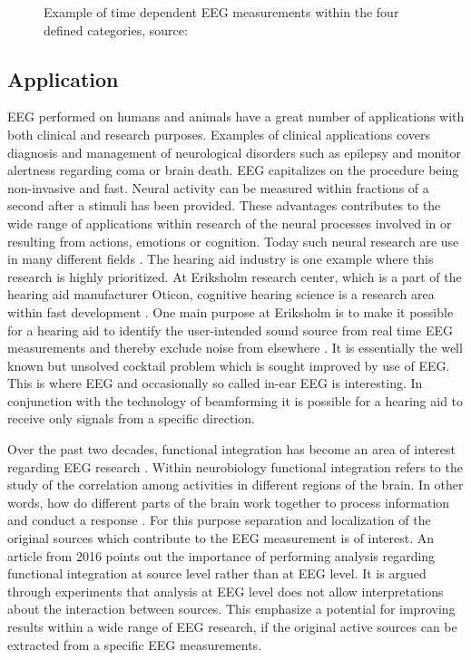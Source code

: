 \begin{figure}[H]
\begin{minipage}[t]{.45\textwidth}
        \caption{Example of time dependent EEG measurements within the four defined categories, source: \cite{EEGsignalprocessing}}\label{fig:EEG_example}
    \end{minipage}
\end{figure}

\subsection{Application}
EEG performed on humans and animals have a great number of applications with both clinical and research purposes. 
Examples of clinical applications covers diagnosis and management of neurological disorders such as epilepsy and monitor alertness regarding coma or brain death.
EEG capitalizes on the procedure being non-invasive and fast.
Neural activity can be measured within fractions of a second after a stimuli has been provided. 
These advantages contributes to the wide range of applications within research of the neural processes involved in or resulting from actions, emotions or  cognition. Today such neural research are use in many different fields \cite[p. 4]{fundamentalEEG}.
The hearing aid industry is one example where this research is highly prioritized. 
At Eriksholm research center, which is a part of the hearing aid manufacturer Oticon, cognitive hearing science is a research area within fast development \cite{Weberik}. 
One main purpose at Eriksholm is to make it possible for a hearing aid to identify the user-intended sound source from real time EEG measurements and thereby exclude noise from elsewhere \cite{Emina2019} \cite{Bech2018}. 
It is essentially the well known but unsolved cocktail problem which is sought improved by use of EEG. 
This is where EEG and occasionally so called in-ear EEG is interesting. In conjunction with the technology of beamforming it is possible for a hearing aid to receive only signals from a specific direction. 

Over the past two decades, functional integration has become an area of interest regarding EEG research \cite{Friston2011}. 
Within neurobiology functional integration refers to the study of the correlation among activities in different regions of the brain. 
In other words, how do different parts of the brain work together to process information and conduct a response \cite{Friston2002}.     
For this purpose separation and localization of the original sources which contribute to the EEG measurement is of interest. 
An article from 2016 \cite{Van2019} points out the importance of performing analysis regarding functional integration at source level rather than at EEG level. 
It is argued through experiments that analysis at EEG level does not allow interpretations about the interaction between sources. 
This emphasize a potential for improving results within a wide range of EEG research, if the original active sources can be extracted from a specific EEG measurements.    

